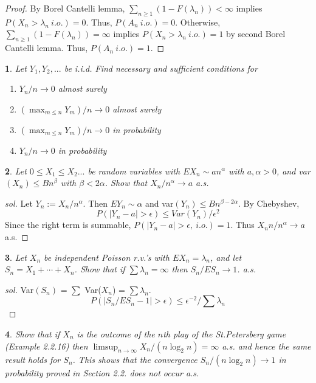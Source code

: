 \documentclass{report}
\newtheorem{ex}{}[section]
\begin{document}
\begin{proof}
By Borel Cantelli lemma, $\sum_{n \ge 1} (1 - F(\lambda_n)) < \infty$ implies $P(X_n > \lambda_n \ i.o.) = 0$. Thus, $P(A_n\ i.o.) = 0$. Otherwise, $\sum_{n \ge 1} (1 - F(\lambda_n)) = \infty$ implies $P(X_n > \lambda_n \ i.o.) = 1$ by second Borel Cantelli lemma. Thus, $P(A_n\ i.o.) = 1$.
\end{proof}
\begin{ex}
Let $Y_1,Y_2,...$ be i.i.d. Find necessary and sufficient conditions for
\begin{enumerate}
\item[(i)] $Y_n / n\to 0$ almost surely
\item[(ii)] $(\max_{m\le n} Y_m)/n \to 0$ almost surely
\item[(iii)] $(\max_{m\le n} Y_m)/n \to 0$ in probability
\item[(iv)] $Y_n/n \to 0$ in probability
\end{enumerate}
\end{ex}
\begin{ex}
Let $0 \le X_1 \le X_2 ...$ be random variables with $EX_n \sim an^\alpha$ with $a, \alpha > 0$, and var$(X_n) \le Bn^\beta$ with $\beta < 2\alpha$. Show that $X_n / n^\alpha \to a$ a.s.
\end{ex}
\begin{proof}[sol]
Let $Y_n := X_n /n^\alpha$. Then $EY_n \sim \alpha$ and var$(Y_n) \le Bn^{\beta - 2\alpha}$. By Chebyshev,
\[P(|Y_n - a| > \epsilon) \le Var(Y_n)/\epsilon^2\]
Since the right term is summable, $P(|Y_n - a| > \epsilon, \ i.o.) = 1$. Thus $X_nn / n^\alpha \to a$ a.s.
\end{proof}
\begin{ex}
Let $X_n$ be independent Poisson r.v.'s with $EX_n = \lambda_n$, and let $S_n = X_1 + \dotsb + X_n$. Show that if $\sum\lambda_n = \infty$ then $S_n/ES_n \to 1$. a.s.
\end{ex}
\begin{proof}[sol]
Var$(S_n)$ = $\sum$ Var($X_n$) = $\sum \lambda_n$.
\[P(|S_n /ES_n - 1| > \epsilon) \le \epsilon^{-2}/\sum\lambda_n\]
\end{proof}
\begin{ex}
Show that if $X_n$ is the outcome of the $n$th play of the St.Petersberg game (Example 2.2.16) then $\limsup_{n\to\infty} X_n/ (n\log_2 n) = \infty$ a.s. and hence the same result holds for $S_n$. This shows that the convergence $S_n / (n\log_2 n) \to 1$ in probability proved in Section 2.2. does not occur a.s.
\end{ex}
\end{document}
